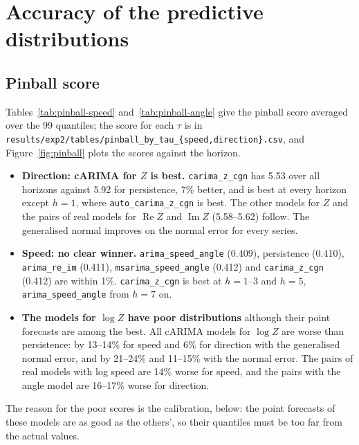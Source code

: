 \documentclass[11pt,a4paper]{article}
\newcommand{\code}[1]{\texttt{#1}}
\newcommand{\1}{\mathbf{1}}
\renewcommand{\Re}{\operatorname{Re}}
\renewcommand{\Im}{\operatorname{Im}}
\begin{document}
\section{Accuracy of the predictive distributions}\label{sec:probabilistic}

\subsection{Pinball score}

Tables~\ref{tab:pinball-speed} and~\ref{tab:pinball-angle} give the pinball score averaged over
the 99 quantiles; the score for each $\tau$ is in
\code{results/exp2/tables/pinball\_by\_tau\_\{speed,direction\}.csv}, and Figure~\ref{fig:pinball}
plots the scores against the horizon.
\begin{itemize}
  \item \textbf{Direction: cARIMA for $Z$ is best.} \code{carima\_z\_cgn} has 5.53 over all
    horizons against 5.92 for persistence, 7\% better, and is best at every horizon except $h = 1$,
    where \code{auto\_carima\_z\_cgn} is best. The other models for $Z$ and the pairs of real models
    for $\Re Z$ and $\Im Z$ (5.58--5.62) follow. The generalised normal improves on the normal
    error for every series.
  \item \textbf{Speed: no clear winner.} \code{arima\_speed\_angle} (0.409), persistence (0.410),
    \code{arima\_re\_im} (0.411), \code{msarima\_speed\_angle} (0.412) and \code{carima\_z\_cgn}
    (0.412) are within 1\%. \code{carima\_z\_cgn} is best at $h = 1$--$3$ and $h = 5$,
    \code{arima\_speed\_angle} from $h = 7$ on.
  \item \textbf{The models for $\log Z$ have poor distributions} although their point forecasts are
    among the best. All cARIMA models for $\log Z$ are worse than persistence: by 13--14\% for
    speed and 6\% for direction with the generalised normal error, and by 21--24\% and 11--15\%
    with the normal error. The pairs of real models with log speed are 14\% worse for speed, and
    the pairs with the angle model are 16--17\% worse for direction.
\end{itemize}
The reason for the poor scores is the calibration, below: the point forecasts of these models are
as good as the others', so their quantiles must be too far from the actual values.
\end{document}
